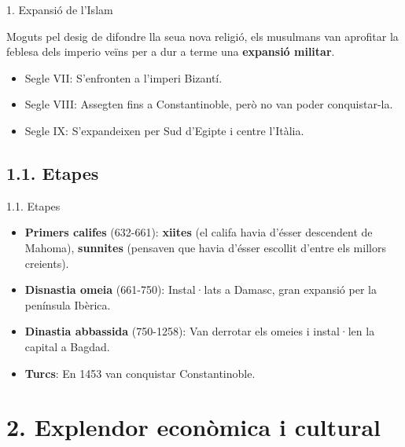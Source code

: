 \documentclass{beamer}
\begin{document}
\begin{frame}{1. Expansió de l'Islam}

Moguts pel desig de difondre lla seua nova religió, els musulmans van aprofitar la feblesa dels imperio veïns per a dur a terme una \textbf{expansió militar}.
   
\begin{itemize}

  \itemsep1pt\parskip0pt
  \item Segle VII: S'enfronten a l'imperi Bizantí.
  \item Segle VIII: Assegten fins a Constantinoble, però no van poder conquistar-la.
  \item Segle IX: S'expandeixen per Sud d'Egipte i centre l'Itàlia.

\end{itemize}

\end{frame}

\subsection{1.1. Etapes}\label{etapes}

\begin{frame}{1.1. Etapes}

\begin{itemize}
     \itemsep1pt\parskip0pt
     \item  \textbf{Primers califes} (632-661): \textbf{xiites} (el califa havia  d'ésser descendent de Mahoma), \textbf{sunnites} (pensaven que havia  d'ésser escollit d'entre els millors creients).
      \item  \textbf{Disnastia omeia} (661-750): Instal·lats a Damasc, gran  expansió per la península Ibèrica.
      \item  \textbf{Dinastia abbassida} (750-1258): Van derrotar els omeies i  instal·len la capital a Bagdad.
      \item  \textbf{Turcs}: En 1453 van conquistar Constantinoble.
   \end{itemize}

   \end{frame}


\section{2. Explendor econòmica i cultural}\label{explendor-econuxf2mica-i-cultural}
\end{document}
